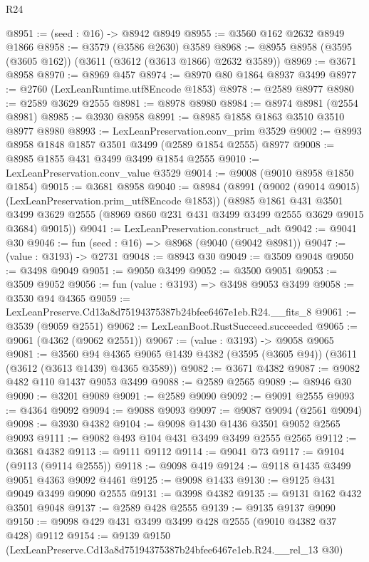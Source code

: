 \begin{lexlean}{R24}
\begin{coremodule}
@8951 := (seed : @16) -> @8942 @8949
@8955 := @3560 @162 @2632 @8949 @1866
@8958 := @3579 (@3586 @2630) @3589
@8968 := @8955 @8958 (@3595 (@3605 @162)) (@3611 (@3612 (@3613 @1866) @2632 @3589))
@8969 := @3671 @8958
@8970 := @8969 @457
@8974 := @8970 @80 @1864 @8937 @3499
@8977 := @2760 (LexLeanRuntime.utf8Encode @1853)
@8978 := @2589 @8977
@8980 := @2589 @3629 @2555
@8981 := @8978 @8980
@8984 := @8974 @8981 (@2554 @8981)
@8985 := @3930 @8958
@8991 := @8985 @1858 @1863 @3510 @3510 @8977 @8980
@8993 := LexLeanPreservation.conv_prim @3529
@9002 := @8993 @8958 @1848 @1857 @3501 @3499 (@2589 @1854 @2555) @8977
@9008 := @8985 @1855 @431 @3499 @3499 @1854 @2555
@9010 := LexLeanPreservation.conv_value @3529
@9014 := @9008 (@9010 @8958 @1850 @1854)
@9015 := @3681 @8958
@9040 := @8984
    (@8991
      (@9002 (@9014 @9015) (LexLeanPreservation.prim_utf8Encode @1853))
      (@8985
        @1861
        @431
        @3501
        @3499
        @3629
        @2555
        (@8969 @860 @231 @431 @3499 @3499 @2555 @3629 @9015 @3684)
        @9015))
@9041 := LexLeanPreservation.construct_adt
@9042 := @9041 @30
@9046 := fun (seed : @16) => @8968 (@9040 (@9042 @8981))
@9047 := (value : @3193) -> @2731
@9048 := @8943 @30
@9049 := @3509 @9048
@9050 := @3498 @9049
@9051 := @9050 @3499
@9052 := @3500 @9051
@9053 := @3509 @9052
@9056 := fun (value : @3193) => @3498 @9053 @3499
@9058 := @3530 @94 @4365
@9059 := LexLeanPreserve.Cd13a8d75194375387b24bfee6467e1eb.R24.__fits_8
@9061 := @3539 (@9059 @2551)
@9062 := LexLeanBoot.RustSucceed.succeeded
@9065 := @9061 (@4362 (@9062 @2551))
@9067 := (value : @3193) -> @9058 @9065
@9081 := @3560
    @94
    @4365
    @9065
    @1439
    @4382
    (@3595 (@3605 @94))
    (@3611 (@3612 (@3613 @1439) @4365 @3589))
@9082 := @3671 @4382
@9087 := @9082 @482 @110 @1437 @9053 @3499
@9088 := @2589 @2565
@9089 := @8946 @30
@9090 := @3201 @9089
@9091 := @2589 @9090
@9092 := @9091 @2555
@9093 := @4364 @9092
@9094 := @9088 @9093
@9097 := @9087 @9094 (@2561 @9094)
@9098 := @3930 @4382
@9104 := @9098 @1430 @1436 @3501 @9052 @2565 @9093
@9111 := @9082 @493 @104 @431 @3499 @3499 @2555 @2565
@9112 := @3681 @4382
@9113 := @9111 @9112
@9114 := @9041 @73
@9117 := @9104 (@9113 (@9114 @2555))
@9118 := @9098 @419
@9124 := @9118 @1435 @3499 @9051 @4363 @9092 @4461
@9125 := @9098 @1433
@9130 := @9125 @431 @9049 @3499 @9090 @2555
@9131 := @3998 @4382
@9135 := @9131 @162 @432 @3501 @9048
@9137 := @2589 @428 @2555
@9139 := @9135 @9137 @9090
@9150 := @9098 @429 @431 @3499 @3499 @428 @2555 (@9010 @4382 @37 @428) @9112
@9154 := @9139 @9150 (LexLeanPreserve.Cd13a8d75194375387b24bfee6467e1eb.R24.__rel_13 @30)

\end{coremodule}
\end{lexlean}
